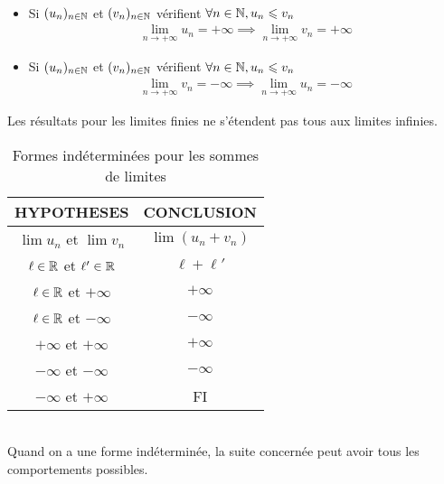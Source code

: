 \begin{graybox}
\begin{theoreme}~ 
    \begin{itemize}
        \item Si $(u_n)_{n \in \mathbb{N}}$ et $(v_n)_{n \in \mathbb{N}}$ vérifient $\forall n \in \mathbb{N}, u_n \leqslant v_n$ 
            \begin{align*}
                \lim_{n \to +\infty} u_n = +\infty \implies \lim_{n \to +\infty} v_n = +\infty
            \end{align*}
        \item Si $(u_n)_{n \in \mathbb{N}}$ et $(v_n)_{n \in \mathbb{N}}$ vérifient $\forall n \in \mathbb{N}, u_n \leqslant v_n$
            \begin{align*}
                \lim_{n \to +\infty} v_n = -\infty \implies \lim_{n \to +\infty} u_n = -\infty
            \end{align*}
    \end{itemize}
\end{theoreme}
\end{graybox}
\begin{remarque}
Les résultats pour les limites finies ne s'étendent pas tous aux limites infinies.
\begin{table}[!h]
\centering
\begin{tabular}{c c}
HYPOTHESES & CONCLUSION \\
\hline
$\lim u_n$ et  $\lim v_n$ & $\lim (u_n + v_n)$ \\
$\ell \in \mathbb{R}$ et $\ell ' \in \mathbb{R}$ & $\ell + \ell'$ \\
$\ell \in \mathbb{R}$ et $+\infty$ & $+\infty$ \\
$\ell \in \mathbb{R}$ et $-\infty$ & $-\infty$ \\
$+\infty$ et $+\infty$ & $+\infty$ \\
$-\infty$ et $-\infty$ & $-\infty$ \\
$-\infty$ et $+\infty$ & FI \\
\hline
\end{tabular}
\caption{Formes indéterminées pour les sommes de limites}
\end{table}
\\
Quand on a une forme indéterminée, la suite concernée peut avoir tous les comportements possibles.
\end{remarque}


